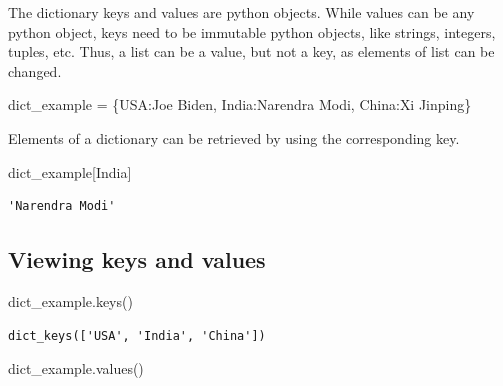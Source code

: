 \documentclass[
  letterpaper,
  DIV=11,
  numbers=noendperiod]{scrreprt}
\newenvironment{Shaded}{\begin{snugshade}}{\end{snugshade}}
\newcommand{\NormalTok}[1]{\textcolor[rgb]{0.00,0.23,0.31}{#1}}
\newcommand{\OperatorTok}[1]{\textcolor[rgb]{0.37,0.37,0.37}{#1}}
\newcommand{\StringTok}[1]{\textcolor[rgb]{0.13,0.47,0.30}{#1}}
\begin{document}
The dictionary keys and values are python objects. While values can be
any python object, keys need to be immutable python objects, like
strings, integers, tuples, etc. Thus, a list can be a value, but not a
key, as elements of list can be changed.

\begin{Shaded}
\begin{Highlighting}[]
\NormalTok{dict\_example }\OperatorTok{=}\NormalTok{ \{}\StringTok{\textquotesingle{}USA\textquotesingle{}}\NormalTok{:}\StringTok{\textquotesingle{}Joe Biden\textquotesingle{}}\NormalTok{, }\StringTok{\textquotesingle{}India\textquotesingle{}}\NormalTok{:}\StringTok{\textquotesingle{}Narendra Modi\textquotesingle{}}\NormalTok{, }\StringTok{\textquotesingle{}China\textquotesingle{}}\NormalTok{:}\StringTok{\textquotesingle{}Xi Jinping\textquotesingle{}}\NormalTok{\}}
\end{Highlighting}
\end{Shaded}

Elements of a dictionary can be retrieved by using the corresponding
key.

\begin{Shaded}
\begin{Highlighting}[]
\NormalTok{dict\_example[}\StringTok{\textquotesingle{}India\textquotesingle{}}\NormalTok{]}
\end{Highlighting}
\end{Shaded}

\begin{verbatim}
'Narendra Modi'
\end{verbatim}

\hypertarget{viewing-keys-and-values}{%
\subsection{Viewing keys and values}\label{viewing-keys-and-values}}

\begin{Shaded}
\begin{Highlighting}[]
\NormalTok{dict\_example.keys()}
\end{Highlighting}
\end{Shaded}

\begin{verbatim}
dict_keys(['USA', 'India', 'China'])
\end{verbatim}

\begin{Shaded}
\begin{Highlighting}[]
\NormalTok{dict\_example.values()}
\end{Highlighting}
\end{Shaded}
\end{document}
